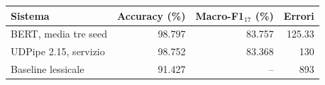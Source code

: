 \begin{tabular}{lrrr}
\toprule
Sistema & Accuracy (\%) & Macro-F1$_{17}$ (\%) & Errori \\
\midrule
BERT, media tre seed & 98.797 & 83.757 & 125.33 \\
UDPipe 2.15, servizio & 98.752 & 83.368 & 130 \\
Baseline lessicale & 91.427 & -- & 893 \\
\bottomrule
\end{tabular}